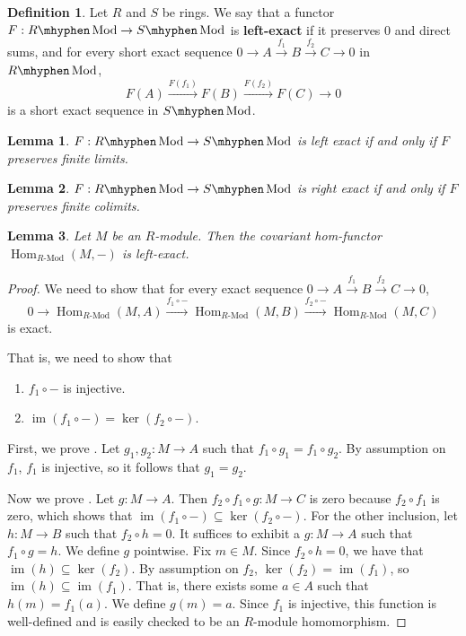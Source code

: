 \documentclass[11pt]{article}
\newcommand{\Hom}{\operatorname{Hom}}
\newcommand{\RHom}[3]{\Hom_{{#1}\text{-Mod}}({#2}, {#3})}
\newcommand{\im}{\operatorname{im}}
\renewcommand{\ker}{\operatorname{ker}}
\newcommand{\Mod}{\mhyphen\operatorname{Mod}}
\theoremstyle{plain}
\newtheorem{lemma}{Lemma}[section]
\theoremstyle{definition}
\newtheorem{definition}{Definition}[section]
\begin{document}
\begin{definition} \label{def:right-exact}
  Let \(R\) and \(S\) be rings. We say that a functor \(F : R\Mod \to S\Mod\) is \textbf{left-exact} if it preserves \(0\) and direct sums, and for every short exact sequence \(0 \to A \overset{f_1}{\to} B \overset{f_2}{\to} C \to 0\) in \(R\Mod\),
  \[F(A) \overset{F(f_1)}{\to} F(B) \overset{F(f_2)}{\to} F(C) \to 0\]
  is a short exact sequence in \(S\Mod\).
\end{definition}

\begin{lemma}\label{lemma:left-exact-finite-limits}
  \(F : R\Mod \to S\Mod\) is left exact if and only if \(F\) preserves finite limits.
\end{lemma}

\begin{lemma}\label{lemma:right-exact-finite-limits}
  \(F : R\Mod \to S\Mod\) is right exact if and only if \(F\) preserves finite colimits.
\end{lemma}

\begin{lemma}\label{lemma:covariant-hom-left-exact}
  Let \(M\) be an \(R\)-module. Then the covariant hom-functor \(\RHom{R}{M}{-}\) is left-exact.
\end{lemma}

\begin{proof}
  We need to show that for every exact sequence \(0 \to A \overset{f_1}{\to} B \overset{f_2}{\to} C \to 0\),
  \[0 \to \RHom{R}{M}{A} \overset{f_1 \circ -}{\to} \RHom{R}{M}{B} \overset{f_2 \circ -}{\to} \RHom{R}{M}{C}\]
  is exact.

  That is, we need to show that
  \begin{enumerate}
  \item \label{lemma:covariant-hom-left-exact-1}\(f_1 \circ -\) is injective.
  \item \label{lemma:covariant-hom-left-exact-2} \(\im(f_1 \circ -) = \ker(f_2 \circ -)\).
  \end{enumerate}

First, we prove  .
    Let \(g_1, g_2 : M \to A\) such that \(f_1 \circ g_1 = f_1 \circ g_2\). By assumption on \(f_1\), \(f_1\) is injective, so it follows that \(g_1 = g_2\).

Now we prove .
    Let \(g : M \to A\). Then \(f_2 \circ f_1 \circ g : M \to C\) is zero because \(f_2 \circ f_1\) is zero, which shows that \(\im(f_1 \circ -) \subseteq \ker(f_2 \circ -)\). For the other inclusion, let \(h : M \to B\)  such that \(f_2 \circ h = 0\). It suffices to exhibit a \(g : M \to A\) such that \(f_1 \circ g = h\). We define \(g\) pointwise. Fix \(m \in M\). Since \(f_2 \circ h = 0\), we have that \(\im(h) \subseteq \ker(f_2)\). By assumption on \(f_2\), \(\ker(f_2) = \im(f_1)\), so \(\im(h) \subseteq \im(f_1)\). That is, there exists some \(a \in A\) such that \(h(m) = f_1(a)\). We define \(g(m) = a\). Since \(f_1\) is injective, this function is well-defined and is easily checked to be an \(R\)-module homomorphism.

  \end{proof}
\end{document}
